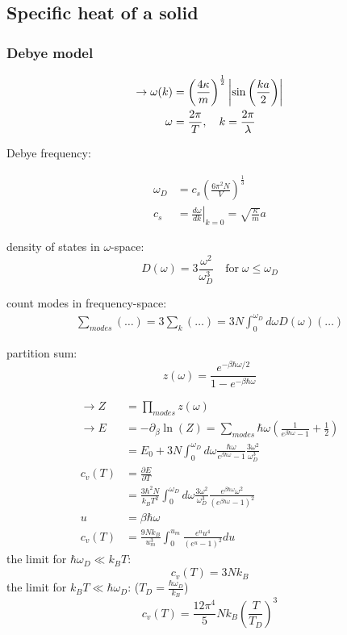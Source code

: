 \subsection*{Specific heat of a solid}
\subsubsection*{Debye model}

\[
    \begin{aligned}
        \rightarrow \omega(k) &= \left(\frac{4 \kappa}{m}\right)^{\frac{1}{2}} \left\vert\sin \left(\frac{ka}{2}\right)\right\vert \\
        \omega &= \frac{2 \pi}{T}, \quad k = \frac{2 \pi}{\lambda} \\
    \end{aligned}
\]

Debye frequency:

\[
    \begin{aligned}
        \omega_D &= c_s \left(\frac{6 \pi^2 N}{V}\right)^{\frac{1}{3}} \\
        c_s &= \left. \frac{d\omega}{dk} \right|_{k=0} = \sqrt{\frac{\kappa}{m}}a
    \end{aligned}
\]

density of states in $\omega$-space:
\[
    D(\omega) = 3 \frac{\omega^2}{\omega_D^3} \quad \text{for} \; \omega \leq \omega_D
\]

count modes in frequency-space:
\[
    \begin{aligned}
        \sum_{modes} (\dots) = 3 \sum_k (\dots) = 3N \int_0^{\omega_D} d\omega D(\omega) (\dots)
    \end{aligned}
\]

partition sum:
\[
    z(\omega) = \frac{e^{-\beta \hbar \omega/2}}{1- e^{-\beta \hbar \omega}}
\]

\[
    \begin{aligned}
        \rightarrow Z &= \prod_{modes} z(\omega) \\
        \rightarrow E &= - \partial_\beta \ln(Z) = \sum_{modes} \hbar \omega \left(\frac{1}{e^{\beta \hbar \omega}-1} +\frac{1}{2}\right)\\
            &= E_0 + 3N \int_0^{\omega_D} d\omega \frac{\hbar \omega}{e^{\beta \hbar \omega}-1} \frac{3 \omega^2}{\omega_D^3}\\
        c_v(T) &= \frac{\partial E}{\partial T} \\
            &= \frac{3 \hbar^2 N}{k_B T^2} \int_0^{\omega_D} d\omega \frac{3\omega^2}{\omega_D^3} \frac{e^{\beta \hbar \omega}\omega^2}{\left(e^{\beta \hbar \omega}-1\right)^2} \\
        u &= \beta \hbar \omega \\
        c_v(T) &= \frac{9Nk_B}{u_m^3} \int_0^{u_m} \frac{e^u u^4}{\left(e^u -1\right)^2} du
    \end{aligned}
\]
the limit for $\hbar \omega_D \ll k_B T$:
\[
    c_v(T) = 3Nk_B
\]
the limit for $k_B T \ll \hbar \omega_D$: ($T_D = \frac{\hbar \omega_D}{k_B}$)
\[
    c_v(T) = \frac{12 \pi^4}{5} N k_B \left(\frac{T}{T_D}\right)^3
\]

